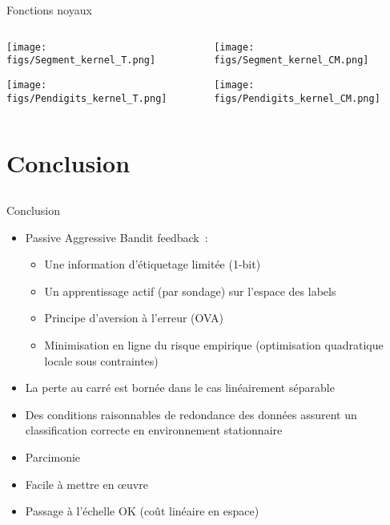 \documentclass{beamer}
\begin{document}
\begin{frame}{Fonctions noyaux}
	\begin{columns}[t]
		\begin{column}{.45\linewidth}
\centerline{
	\texttt{[image: figs/Segment\_kernel\_T.png]}}
\centerline{\texttt{[image: figs/Pendigits\_kernel\_T.png]}}			
		\end{column}
		\begin{column}{.45\linewidth}
	\centerline{
		\texttt{[image: figs/Segment\_kernel\_CM.png]}}
	\centerline{
		\texttt{[image: figs/Pendigits\_kernel\_CM.png]}}
		\end{column}	
	\end{columns}
\end{frame}

\section{Conclusion}
\subsection{}
\begin{frame}{Conclusion}
	\begin{itemize}
		\item Passive Aggressive Bandit feedback~:
		\begin{itemize}
			\item Une information d'étiquetage limitée (1-bit)
			\item Un apprentissage actif (par sondage) sur l'espace des labels 
			\item Principe d'aversion à l'erreur (OVA)
			\item Minimisation en ligne du risque empirique (optimisation quadratique locale sous contraintes)
		\end{itemize} 
		\item La perte au carré est bornée dans le cas linéairement séparable
		\item Des conditions raisonnables de redondance des données assurent un classification correcte en environnement stationnaire
		\item Parcimonie
		\item Facile à mettre en œuvre
		\item Passage à l'échelle OK (coût linéaire en espace)
	\end{itemize}
\end{frame}
\end{document}
